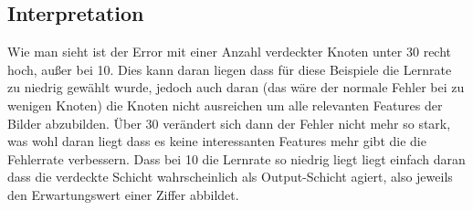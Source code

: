 \documentclass{article}
\begin{document}
\subsection{Interpretation}
Wie man sieht ist der Error mit einer Anzahl verdeckter Knoten unter 30 recht hoch, außer bei 10. Dies kann daran liegen dass für diese Beispiele die Lernrate zu niedrig gewählt wurde, jedoch auch daran (das wäre der normale Fehler bei zu wenigen Knoten) die Knoten nicht ausreichen um alle relevanten Features der Bilder abzubilden. Über 30 verändert sich dann der Fehler nicht mehr so stark, was wohl daran liegt dass es keine interessanten Features mehr gibt die die Fehlerrate verbessern.
Dass bei 10 die Lernrate so niedrig liegt liegt einfach daran dass die verdeckte Schicht wahrscheinlich als Output-Schicht agiert, also jeweils den Erwartungswert einer Ziffer abbildet.
\end{document}
